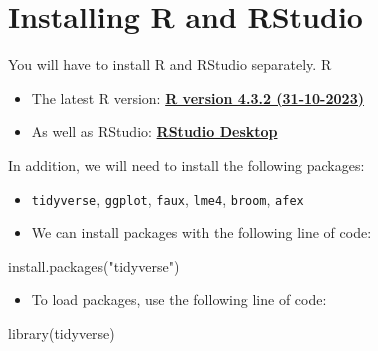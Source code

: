 \documentclass[
  letterpaper,
  DIV=11,
  numbers=noendperiod,
  oneside]{scrreprt}
\newenvironment{Shaded}{\begin{snugshade}}{\end{snugshade}}
\newcommand{\FunctionTok}[1]{\textcolor[rgb]{0.28,0.35,0.67}{#1}}
\newcommand{\NormalTok}[1]{\textcolor[rgb]{0.00,0.23,0.31}{#1}}
\newcommand{\StringTok}[1]{\textcolor[rgb]{0.13,0.47,0.30}{#1}}
\providecommand{\tightlist}{%
  \setlength{\itemsep}{0pt}\setlength{\parskip}{0pt}}\usepackage{longtable,booktabs,array}
\begin{document}

\hypertarget{installing-r-and-rstudio}{%
\chapter{Installing R and RStudio}\label{installing-r-and-rstudio}}

\hfill\break

You will have to install R and RStudio separately. R

\begin{itemize}
\item
  The latest R version: \href{https://cran.rstudio.com/}{\textbf{R
  version 4.3.2 (31-10-2023)}}
\item
  As well as RStudio:
  \href{https://posit.co/download/rstudio-desktop/}{\textbf{RStudio
  Desktop}}
\end{itemize}

In addition, we will need to install the following packages:

\begin{itemize}
\item
  \texttt{tidyverse}, \texttt{ggplot}, \texttt{faux}, \texttt{lme4},
  \texttt{broom}, \texttt{afex}
\item
  We can install packages with the following line of code:
\end{itemize}

\begin{Shaded}
\begin{Highlighting}[]
    \FunctionTok{install.packages}\NormalTok{(}\StringTok{"tidyverse"}\NormalTok{)}
\end{Highlighting}
\end{Shaded}

\begin{itemize}
\tightlist
\item
  To load packages, use the following line of code:
\end{itemize}

\begin{Shaded}
\begin{Highlighting}[]
    \FunctionTok{library}\NormalTok{(tidyverse)}
\end{Highlighting}
\end{Shaded}
\end{document}
